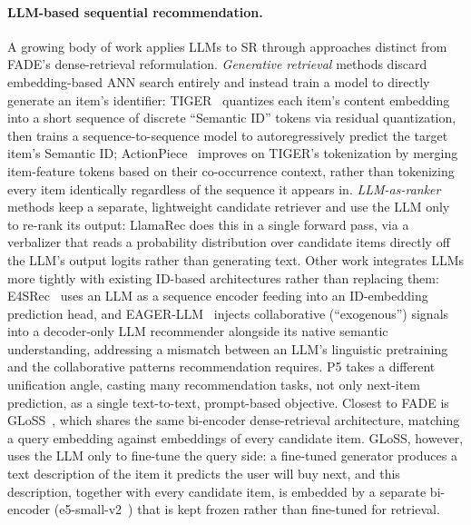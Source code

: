 \documentclass[runningheads]{llncs}
\begin{document}
\paragraph{LLM-based sequential recommendation.}
A growing body of work applies LLMs to SR through approaches distinct from FADE's dense-retrieval reformulation. \emph{Generative retrieval} methods discard embedding-based ANN search entirely and instead train a model to directly generate an item's identifier: TIGER~\cite{rajput2023} quantizes each item's content embedding into a short sequence of discrete ``Semantic ID'' tokens via residual quantization, then trains a sequence-to-sequence model to autoregressively predict the target item's Semantic ID; ActionPiece~\cite{hou2025} improves on TIGER's tokenization by merging item-feature tokens based on their co-occurrence context, rather than tokenizing every item identically regardless of the sequence it appears in. \emph{LLM-as-ranker} methods keep a separate, lightweight candidate retriever and use the LLM only to re-rank its output: LlamaRec \cite{yue2023} does this in a single forward pass, via a verbalizer that reads a probability distribution over candidate items directly off the LLM's output logits rather than generating text. Other work integrates LLMs more tightly with existing ID-based architectures rather than replacing them: E4SRec~\cite{li2024} uses an LLM as a sequence encoder feeding into an ID-embedding prediction head, and EAGER-LLM~\cite{hong2025} injects collaborative (``exogenous'') signals into a decoder-only LLM recommender alongside its native semantic understanding, addressing a mismatch between an LLM's linguistic pretraining and the collaborative patterns recommendation requires. P5 \cite{geng2022} takes a different unification angle, casting many recommendation tasks, not only next-item prediction, as a single text-to-text, prompt-based objective. Closest to FADE is GLoSS~\cite{acharya2025}, which shares the same bi-encoder dense-retrieval architecture, matching a query embedding against embeddings of every candidate item. GLoSS, however, uses the LLM only to fine-tune the query side: a fine-tuned generator produces a text description of the item it predicts the user will buy next, and this description, together with every candidate item, is embedded by a separate bi-encoder (e5-small-v2~\cite{wang2022e5}) that is kept frozen rather than fine-tuned for retrieval.
\end{document}
